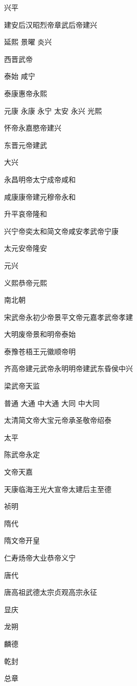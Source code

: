 \documentclass[a4paper,12pt,UTF8,twoside]{ctexbook}
\begin{document}
    兴平
    
    建安后汉昭烈帝章武后帝建兴
    
    延熙
    景曜
    炎兴
    
    西晋武帝
    
    泰始
    咸宁
    
    泰康惠帝永熙
    
    元康
    永康
    永宁
    太安
    永兴
    光熙
    
    怀帝永嘉愍帝建兴
    
    东晋元帝建武
    
    大兴
    
    永昌明帝太宁成帝咸和
    
    咸康康帝建元穆帝永和
    
    升平哀帝隆和
    
    兴宁帝奕太和简文帝咸安孝武帝宁康
    
    太元安帝隆安
    
    元兴
    
    义熙恭帝元熙
    
    南北朝
    
    宋武帝永初少帝景平文帝元嘉孝武帝孝建
    
    大明废帝景和明帝泰始
    
    泰豫苍梧王元徽顺帝明
    
    齐高帝建元武帝永明明帝建武东昏侯中兴
    
    梁武帝天监
    
    普通
    大通
    中大通
    大同
    中大同
    
    太清简文帝大宝元帝承圣敬帝绍泰
    
    太平
    
    陈武帝永定
    
    文帝天嘉
    
    天康临海王光大宣帝太建后主至德
    
    祯明
    
    隋代
    
    隋文帝开皇
    
    仁寿炀帝大业恭帝义宁
    
    唐代
    
    唐高祖武德太宗贞观高宗永征
    
    显庆
    
    龙朔
    
    麟德
    
    乾封
    
    总章
    
\end{document}

